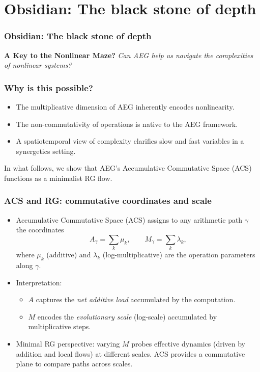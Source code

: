 \documentclass[aspectratio=169]{beamer}
\begin{document}
\section{Obsidian: The black stone of depth}

\begin{frame}
    \frametitle{Obsidian: The black stone of depth}
    \begin{center}
        \Large
        \textbf{A Key to the Nonlinear Maze?}
        \newline\newline
        \emph{Can AEG help us navigate the complexities of nonlinear systems?}
    \end{center}
\end{frame}

\begin{frame}
    \frametitle{Why is this possible?}
    \begin{itemize}
        \item The multiplicative dimension of AEG inherently encodes nonlinearity.
        \item The non-commutativity of operations is native to the AEG framework.
        \item A spatiotemporal view of complexity clarifies slow and fast variables in a synergetics setting.
    \end{itemize}
    In what follows, we show that AEG's Accumulative Commutative Space (ACS) functions as a minimalist RG flow.
\end{frame}

\begin{frame}
    \frametitle{ACS and RG: commutative coordinates and scale}
    \begin{itemize}
        \item Accumulative Commutative Space (ACS) assigns to any arithmetic path $\gamma$ the coordinates
        \[
            A_\gamma = \sum_k \mu_k,\qquad M_\gamma = \sum_k \lambda_k,
        \]
        where $\mu_k$ (additive) and $\lambda_k$ (log-multiplicative) are the operation parameters along $\gamma$.
        \item Interpretation:
        \begin{itemize}
            \item $A$ captures the \emph{net additive load} accumulated by the computation.
            \item $M$ encodes the \emph{evolutionary scale} (log-scale) accumulated by multiplicative steps.
        \end{itemize}
        \item Minimal RG perspective: varying $M$ probes effective dynamics (driven by addition and local flows) at different scales. ACS provides a commutative plane to compare paths across scales.
    \end{itemize}
\end{frame}
\end{document}
